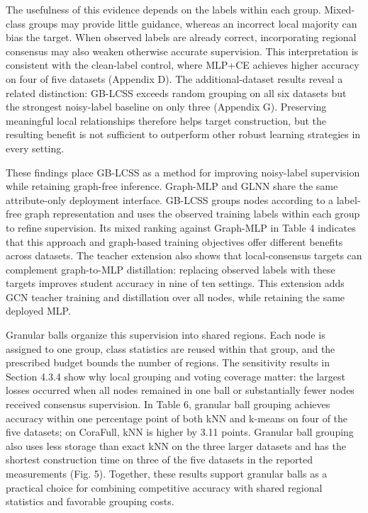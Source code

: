 The usefulness of this evidence depends on the labels within each group. Mixed-class groups may provide little guidance, whereas an incorrect local majority can bias the target. When observed labels are already correct, incorporating regional consensus may also weaken otherwise accurate supervision. This interpretation is consistent with the clean-label control, where MLP+CE achieves higher accuracy on four of five datasets (Appendix D). The additional-dataset results reveal a related distinction: GB-LCSS exceeds random grouping on all six datasets but the strongest noisy-label baseline on only three (Appendix G). Preserving meaningful local relationships therefore helps target construction, but the resulting benefit is not sufficient to outperform other robust learning strategies in every setting.

These findings place GB-LCSS as a method for improving noisy-label supervision while retaining graph-free inference. Graph-MLP and GLNN share the same attribute-only deployment interface. GB-LCSS groups nodes according to a label-free graph representation and uses the observed training labels within each group to refine supervision. Its mixed ranking against Graph-MLP in Table 4 indicates that this approach and graph-based training objectives offer different benefits across datasets. The teacher extension also shows that local-consensus targets can complement graph-to-MLP distillation: replacing observed labels with these targets improves student accuracy in nine of ten settings. This extension adds GCN teacher training and distillation over all nodes, while retaining the same deployed MLP.

Granular balls organize this supervision into shared regions. Each node is assigned to one group, class statistics are reused within that group, and the prescribed budget bounds the number of regions. The sensitivity results in Section 4.3.4 show why local grouping and voting coverage matter: the largest losses occurred when all nodes remained in one ball or substantially fewer nodes received consensus supervision. In Table 6, granular ball grouping achieves accuracy within one percentage point of both kNN and k-means on four of the five datasets; on CoraFull, kNN is higher by 3.11 points. Granular ball grouping also uses less storage than exact kNN on the three larger datasets and has the shortest construction time on three of the five datasets in the reported measurements (Fig. 5). Together, these results support granular balls as a practical choice for combining competitive accuracy with shared regional statistics and favorable grouping costs.

